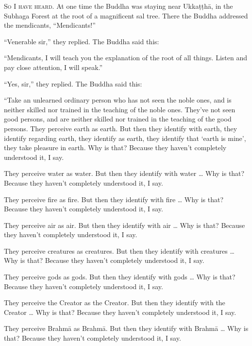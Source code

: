 \documentclass[12pt,openany]{book}%
\newcommand*{\scevam}[1]{\textsc{#1}}
\begin{document}
\scevam{So I have heard. }At one time the Buddha was staying near \textsanskrit{Ukkaṭṭhā}, in the Subhaga Forest at the root of a magnificent sal tree. There the Buddha addressed the mendicants, “Mendicants!” 

“Venerable sir,” they replied. The Buddha said this: 

“Mendicants, I will teach you the explanation of the root of all things. Listen and pay close attention, I will speak.” 

“Yes, sir,” they replied. The Buddha said this: 

“Take an unlearned ordinary person who has not seen the noble ones, and is neither skilled nor trained in the teaching of the noble ones. They’ve not seen good persons, and are neither skilled nor trained in the teaching of the good persons. They perceive earth as earth. But then they identify with earth, they identify regarding earth, they identify as earth, they identify that ‘earth is mine’, they take pleasure in earth. Why is that? Because they haven’t completely understood it, I say. 

They perceive water as water. But then they identify with water … Why is that? Because they haven’t completely understood it, I say. 

They perceive fire as fire. But then they identify with fire … Why is that? Because they haven’t completely understood it, I say. 

They perceive air as air. But then they identify with air … Why is that? Because they haven’t completely understood it, I say. 

They perceive creatures as creatures. But then they identify with creatures … Why is that? Because they haven’t completely understood it, I say. 

They perceive gods as gods. But then they identify with gods … Why is that? Because they haven’t completely understood it, I say. 

They perceive the Creator as the Creator. But then they identify with the Creator … Why is that? Because they haven’t completely understood it, I say. 

They perceive \textsanskrit{Brahmā} as \textsanskrit{Brahmā}. But then they identify with \textsanskrit{Brahmā} … Why is that? Because they haven’t completely understood it, I say. 
\end{document}
